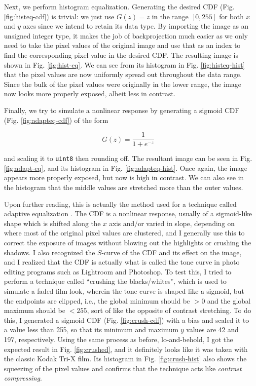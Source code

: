 \documentclass[12pt,a4paper]{article}
\begin{document}
Next, we perform histogram equalization. Generating the desired CDF (Fig. \ref{fig:histeq-cdf}) is trivial: we just use $G(z) = z$ in the range $[0, 255]$ for both $x$ and $y$ axes since we intend to retain its data type. By importing the image as an unsigned integer type, it makes the job of backprojection much easier as we only need to take the pixel values of the original image and use that as an index to find the corresponding pixel value in the desired CDF. The resulting image is shown in Fig. \ref{fig:hist-eq}. We can see from its histogram in Fig. \ref{fig:histeq-hist} that the pixel values are now uniformly spread out throughout the data range. Since the bulk of the pixel values were originally in the lower range, the image now looks more properly exposed, albeit less in contrast.

Finally, we try to simulate a nonlinear response by generating a sigmoid CDF (Fig. \ref{fig:adapteq-cdf}) of the form

\begin{equation}\label{eq:sigmoid}
	G(z) = \frac{1}{1 + e^{-z}}
\end{equation}

\noindent
and scaling it to \texttt{uint8} then rounding off. The resultant image can be seen in Fig. \ref{fig:adapt-eq}, and its histogram in Fig. \ref{fig:adapteq-hist}. Once again, the image appears more properly exposed, but now is high in contrast. We can also see in the histogram that the middle values are stretched more than the outer values.

Upon further reading, this is actually the method used for a technique called adaptive equalization \cite{skimage}. The CDF is a nonlinear response, usually of a sigmoid-like shape which is shifted along the $x$ axis and/or varied in slope, depending on where most of the original pixel values are clustered, and I generally use this to correct the exposure of images without blowing out the highlights or crushing the shadows. I also recognized the $S$-curve of the CDF and its effect on the image, and I realized that the CDF is actually what is called the tone curve in photo editing programs such as Lightroom and Photoshop. To test this, I tried to perform a technique called ``crushing the blacks/whites'', which is used to simulate a faded film look, wherein the tone curve is shaped like a sigmoid, but the endpoints are clipped, i.e., the global minimum should be $> 0$ and the global maximum should be $< 255$, sort of like the opposite of contrast stretching. To do this, I generated a sigmoid CDF (Fig. \ref{fig:crush-cdf}) with a bias and scaled it to a value less than 255, so that its minimum and maximum $y$ values are 42 and 197, respectively. Using the same process as before, lo-and-behold, I got the expected result in Fig. \ref{fig:crushed}, and it definitely looks like it was taken with the classic Kodak Tri-X film. Its histogram in Fig. \ref{fig:crush-hist} also shows the squeezing of the pixel values and confirms that the technique acts like \textit{contrast compressing}.
\end{document}
